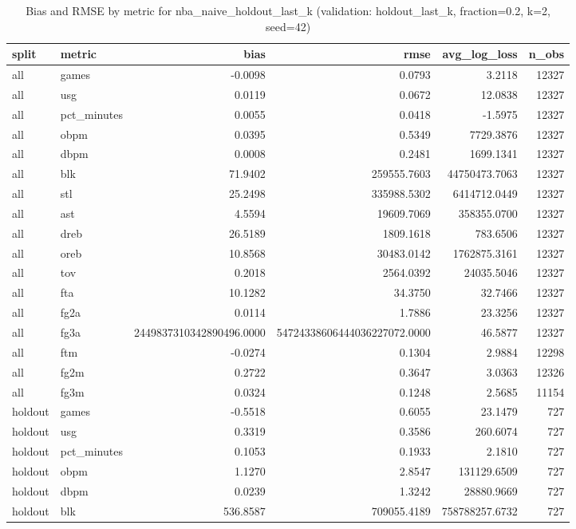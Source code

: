 \begin{table}
\caption{Bias and RMSE by metric for nba_naive_holdout_last_k (validation: holdout_last_k, fraction=0.2, k=2, seed=42)}
\label{tab:nba_naive_holdout_last_k_vs_holdout_last_k_f20_k2_s42_bias_rmse}
\begin{tabular}{llrrrr}
\toprule
split & metric & bias & rmse & avg\_log\_loss & n\_obs \\
\midrule
all & games & -0.0098 & 0.0793 & 3.2118 & 12327 \\
all & usg & 0.0119 & 0.0672 & 12.0838 & 12327 \\
all & pct\_minutes & 0.0055 & 0.0418 & -1.5975 & 12327 \\
all & obpm & 0.0395 & 0.5349 & 7729.3876 & 12327 \\
all & dbpm & 0.0008 & 0.2481 & 1699.1341 & 12327 \\
all & blk & 71.9402 & 259555.7603 & 44750473.7063 & 12327 \\
all & stl & 25.2498 & 335988.5302 & 6414712.0449 & 12327 \\
all & ast & 4.5594 & 19609.7069 & 358355.0700 & 12327 \\
all & dreb & 26.5189 & 1809.1618 & 783.6506 & 12327 \\
all & oreb & 10.8568 & 30483.0142 & 1762875.3161 & 12327 \\
all & tov & 0.2018 & 2564.0392 & 24035.5046 & 12327 \\
all & fta & 10.1282 & 34.3750 & 32.7466 & 12327 \\
all & fg2a & 0.0114 & 1.7886 & 23.3256 & 12327 \\
all & fg3a & 2449837310342890496.0000 & 54724338606444036227072.0000 & 46.5877 & 12327 \\
all & ftm & -0.0274 & 0.1304 & 2.9884 & 12298 \\
all & fg2m & 0.2722 & 0.3647 & 3.0363 & 12326 \\
all & fg3m & 0.0324 & 0.1248 & 2.5685 & 11154 \\
holdout & games & -0.5518 & 0.6055 & 23.1479 & 727 \\
holdout & usg & 0.3319 & 0.3586 & 260.6074 & 727 \\
holdout & pct\_minutes & 0.1053 & 0.1933 & 2.1810 & 727 \\
holdout & obpm & 1.1270 & 2.8547 & 131129.6509 & 727 \\
holdout & dbpm & 0.0239 & 1.3242 & 28880.9669 & 727 \\
holdout & blk & 536.8587 & 709055.4189 & 758788257.6732 & 727 \\

\end{tabular}
\end{table}

